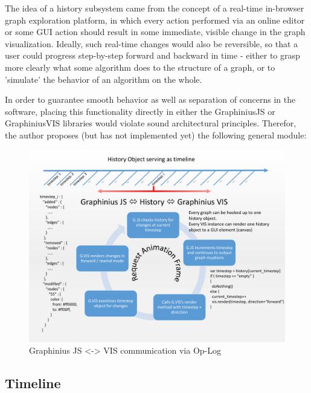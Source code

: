 	The idea of a history subsystem came from the concept of a real-time in-browser graph exploration platform, in which every action performed via an online editor or some GUI action should result in some immediate, visible change in the graph visualization. Ideally, such real-time changes would also be reversible, so that a user could progress step-by-step forward and backward in time - either to grasp more clearly what some algorithm does to the structure of a graph, or to 'simulate' the behavior of an algorithm on the whole. 
	
	In order to guarantee smooth behavior as well as separation of concerns in the software, placing this functionality directly in either the GraphiniusJS or GraphiniusVIS libraries would violate sound architectural principles. Therefor, the author proposes (but has not implemented yet) the following general module:
	
	\begin{landscape}
		\begin{figure}[ht]
			\label{fig_history_workflow}
			\centering
			\vspace{-2.0cm}
			\includegraphics[width=1.6\textwidth]{figures/History_Workflow_pdf}
			\caption{Graphinius JS <-> VIS communication via Op-Log}
		\end{figure}
	\end{landscape}

	\subsection{Timeline}
	\label{ssect:timeline}
	
